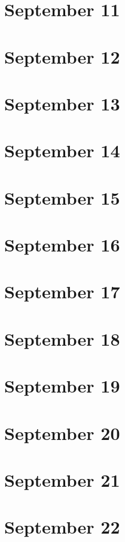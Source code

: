 \section{September 11}

\section{September 12}

\section{September 13}

\section{September 14}

\section{September 15}

\section{September 16}

\section{September 17}

\section{September 18}

\section{September 19}

\section{September 20}

\section{September 21}

\section{September 22}

